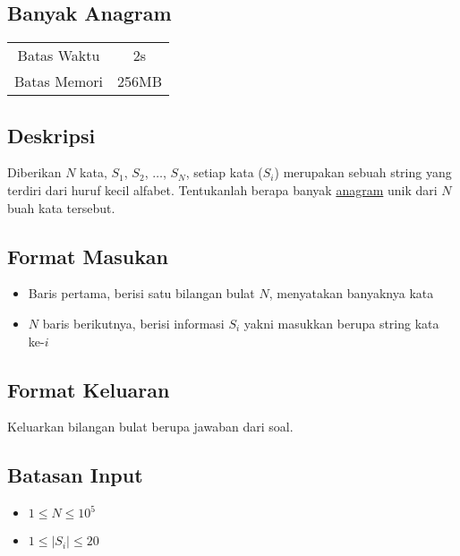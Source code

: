 \documentclass{article}
\begin{document}
\begin{center}
    \section*{Banyak Anagram} %

    \begin{tabular}{ | c c | }
        \hline
        Batas Waktu  & 2s \\    %
        Batas Memori & 256MB \\  %
        \hline
    \end{tabular}
\end{center}

\subsection*{Deskripsi}

Diberikan $N$ kata, $S_1$, $S_2$, $…$, $S_N$, setiap kata ($S_i$) merupakan sebuah string yang terdiri dari huruf kecil alfabet. Tentukanlah berapa banyak \href{https://en.wikipedia.org/wiki/Anagram}{anagram} unik dari $N$ buah kata tersebut.

\subsection*{Format Masukan}
\begin{itemize}
\item Baris pertama, berisi satu bilangan bulat $N$, menyatakan banyaknya kata
\item $N$ baris berikutnya, berisi informasi $S_i$ yakni masukkan berupa string kata ke-$i$
\end{itemize}

\subsection*{Format Keluaran}
Keluarkan bilangan bulat berupa jawaban dari soal.

\subsection*{Batasan Input}

\begin{itemize}
    \item{$1 \leq N \leq 10^5$}
    \item{$1 \leq |S_i| \leq 20$}
\end{itemize}
\end{document}
